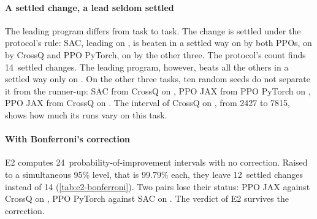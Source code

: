 \paragraph{A settled change, a lead seldom settled}
The leading program differs from task to task. The change is settled under the protocol's rule: SAC, leading
on , is beaten in a settled way on  by both PPOs, on  by CrossQ
and PPO PyTorch, on  by the other three. The protocol's count finds 14~settled changes. The leading
program, however, beats all the others in a settled way only on . On the other three tasks, ten
random seeds do not separate it from the runner-up: SAC from CrossQ on , PPO JAX from PPO
PyTorch on , PPO JAX from CrossQ on . The interval of CrossQ on
, from \num{2427} to \num{7815}, shows how much its runs vary on this task.

\paragraph{With Bonferroni's correction}
E2 computes 24~probability-of-improvement intervals with no correction. Raised to a simultaneous 95\% level,
that is 99.79\% each, they leave 12~settled changes instead of 14 (\cref{tab:e2-bonferroni}).
Two pairs lose their status: PPO JAX against CrossQ on , PPO PyTorch against SAC on
. The verdict of E2 survives the correction.



